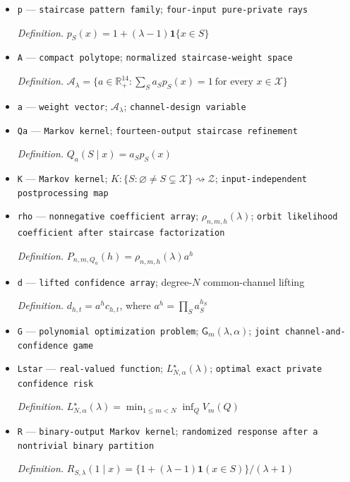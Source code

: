 \documentclass{article}
\begin{document}
\begin{itemize}
  \item \texttt{p} --- \texttt{staircase pattern family}; \texttt{four-\allowbreak{}input pure-\allowbreak{}private rays}
  \par\smallskip\noindent\emph{Definition.} \(p_S(x)=1+(\lambda-1)\mathbf 1\{x\in S\}\)
  \item \texttt{A} --- \texttt{compact polytope}; \texttt{normalized staircase-\allowbreak{}weight space}
  \par\smallskip\noindent\emph{Definition.} \(\mathcal A_\lambda=\{a\in\mathbb R_+^{14}:\sum_Sa_Sp_S(x)=1\ \text{for every }x\in\mathcal X\}\)
  \item \texttt{a} --- \texttt{weight vector}; \(\mathcal A_\lambda\); \texttt{channel-\allowbreak{}design variable}
  \item \texttt{Qa} --- \texttt{Markov kernel}; \texttt{fourteen-\allowbreak{}output staircase refinement}
  \par\smallskip\noindent\emph{Definition.} \(Q_a(S\mid x)=a_Sp_S(x)\)
  \item \texttt{K} --- \texttt{Markov kernel}; \(K:\{S:\varnothing\ne S\subsetneq\mathcal X\}\rightsquigarrow\mathcal Z\); \texttt{input-\allowbreak{}independent postprocessing map}
  \item \texttt{rho} --- \texttt{nonnegative coefficient array}; \(\rho_{n,m,h}(\lambda)\); \texttt{orbit likelihood coefficient after staircase factorization}
  \par\smallskip\noindent\emph{Definition.} \(P_{n,m,Q_a}(h)=\rho_{n,m,h}(\lambda)a^h\)
  \item \texttt{d} --- \texttt{lifted confidence array}; degree-\(N\) common-channel lifting
  \par\smallskip\noindent\emph{Definition.} \(d_{h,t}=a^h c_{h,t}\), where \(a^h=\prod_Sa_S^{h_S}\)
  \item \texttt{G} --- \texttt{polynomial optimization problem}; \(\mathsf G_m(\lambda,\alpha)\); \texttt{joint channel-\allowbreak{}and-\allowbreak{}confidence game}
  \item \texttt{Lstar} --- \texttt{real-\allowbreak{}valued function}; \(L^\star_{N,\alpha}(\lambda)\); \texttt{optimal exact private confidence risk}
  \par\smallskip\noindent\emph{Definition.} \(L^\star_{N,\alpha}(\lambda)=\min_{1\le m<N}\inf_QV_m(Q)\)
  \item \texttt{R} --- \texttt{binary-\allowbreak{}output Markov kernel}; \texttt{randomized response after a nontrivial binary partition}
  \par\smallskip\noindent\emph{Definition.} \(R_{S,\lambda}(1\mid x)=\{1+(\lambda-1)\mathbf 1(x\in S)\}/(\lambda+1)\)

\end{itemize}
\end{document}
